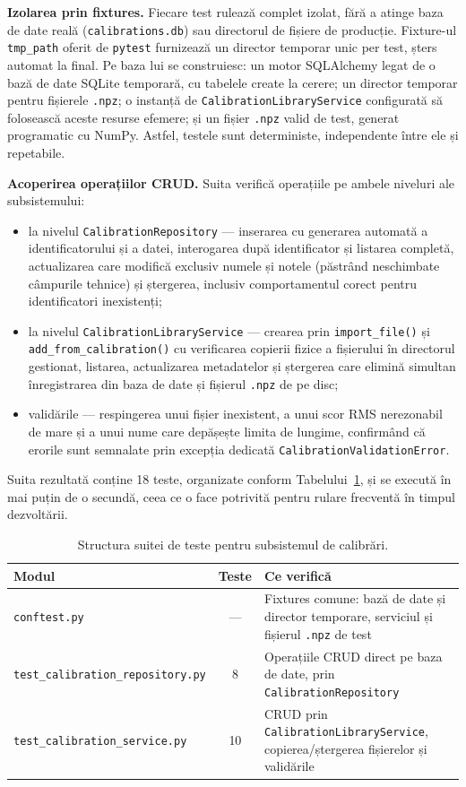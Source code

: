 \textbf{Izolarea prin fixtures.} Fiecare test rulează complet izolat, fără a atinge baza de date reală (\texttt{calibrations.db}) sau directorul de fișiere de producție. Fixture-ul \texttt{tmp\_path} oferit de \texttt{pytest} furnizează un director temporar unic per test, șters automat la final. Pe baza lui se construiesc: un motor SQLAlchemy legat de o bază de date SQLite temporară, cu tabelele create la cerere; un director temporar pentru fișierele \texttt{.npz}; o instanță de \texttt{CalibrationLibraryService} configurată să folosească aceste resurse efemere; și un fișier \texttt{.npz} valid de test, generat programatic cu NumPy. Astfel, testele sunt deterministe, independente între ele și repetabile.

\textbf{Acoperirea operațiilor CRUD.} Suita verifică operațiile pe ambele niveluri ale subsistemului:
\begin{itemize}
    \item la nivelul \texttt{CalibrationRepository} --- inserarea cu generarea automată a identificatorului și a datei, interogarea după identificator și listarea completă, actualizarea care modifică exclusiv numele și notele (păstrând neschimbate câmpurile tehnice) și ștergerea, inclusiv comportamentul corect pentru identificatori inexistenți;
    \item la nivelul \texttt{CalibrationLibraryService} --- crearea prin \texttt{import\_file()} și \texttt{add\_from\_calibration()} cu verificarea copierii fizice a fișierului în directorul gestionat, listarea, actualizarea metadatelor și ștergerea care elimină simultan înregistrarea din baza de date și fișierul \texttt{.npz} de pe disc;
    \item validările --- respingerea unui fișier inexistent, a unui scor RMS nerezonabil de mare și a unui nume care depășește limita de lungime, confirmând că erorile sunt semnalate prin excepția dedicată \texttt{CalibrationValidationError}.
\end{itemize}

Suita rezultată conține 18 teste, organizate conform Tabelului~\ref{tab:tests}, și se execută în mai puțin de o secundă, ceea ce o face potrivită pentru rulare frecventă în timpul dezvoltării.

\begin{table}[htbp]
\centering
\renewcommand{\arraystretch}{1.35}
\begin{tabular}{|l|c|p{6.5cm}|}
\hline
\textbf{Modul} & \textbf{Teste} & \textbf{Ce verifică} \\
\hline
\texttt{conftest.py} & --- & Fixtures comune: bază de date și director temporare, serviciul și fișierul \texttt{.npz} de test \\
\hline
\texttt{test\_calibration\_repository.py} & 8 & Operațiile CRUD direct pe baza de date, prin \texttt{CalibrationRepository} \\
\hline
\texttt{test\_calibration\_service.py} & 10 & CRUD prin \texttt{CalibrationLibraryService}, copierea/ștergerea fișierelor și validările \\
\hline
\end{tabular}
\caption{Structura suitei de teste pentru subsistemul de calibrări.}
\label{tab:tests}
\end{table}

